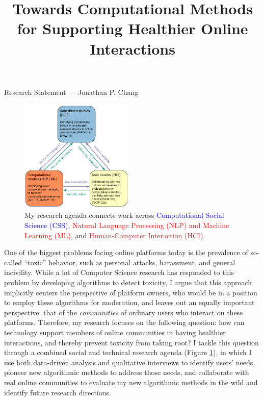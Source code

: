 \documentclass[12pt,letterpaper]{article}
\title{Towards Computational Methods for Supporting Healthier Online Interactions}
\newcommand\introclosing\laresearchintro
\newcommand\introclosing\genresearchintro
\begin{document}
\maketitle

{\centering Research Statement --- Jonathan P. Chang \par}

\vspace{0.5\baselineskip}

\begin{figure}
\centering
\includegraphics[width=0.48\textwidth]{FIG/the-circle-of-life.pdf}
\caption{My research agenda connects work across \textcolor{blue}{Computational Social Science (CSS)}, \textcolor{red}{Natural Language Processing (NLP) and Machine Learning (ML)}, and \textcolor{brown}{Human-Computer Interaction (HCI)}.}
\label{fig:research_overview}
\end{figure}

One of the biggest problems facing online platforms today is the prevalence of so-called ``toxic'' behavior, such as personal attacks, harassment, and general incivility.
While a lot of Computer Science research has responded to this problem by developing algorithms to detect toxicity, I argue that this approach implicitly centers the perspective of platform owners, who would be in a position to employ these algorithms for moderation, and leaves out an equally important perspective: that of the \emph{communities} of ordinary users who interact on these platforms.
Therefore, my research focuses on the following question: how can technology support members of online communities in having healthier interactions, and thereby prevent toxicity from taking root?
I tackle this question through a combined social and technical research agenda (Figure \ref{fig:research_overview}), in which I use both data-driven analysis and qualitative interviews to identify users' needs, pioneer new algorithmic methods to address those needs, and collaborate with real online communities to evaluate my new algorithmic methods in the wild and identify future research directions.
\introclosing
\end{document}
